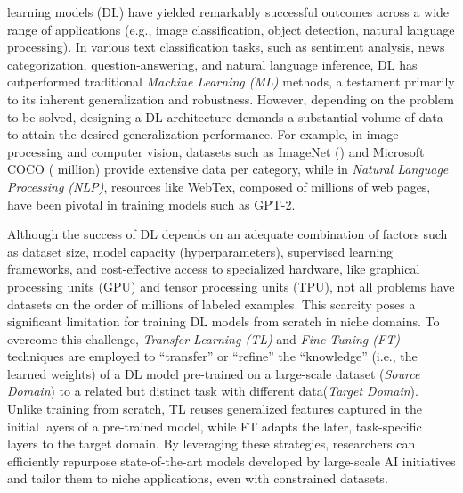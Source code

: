 \documentclass[onecolumn, journal, english, 12pt, a4paper]{IEEEtran} %
\theoremstyle{definition}
\begin{document}
 learning models (DL) have yielded remarkably
successful outcomes across a wide range of applications (e.g., image
classification, object detection, natural language
processing)\cite{PATHAK20181706}. In various text classification
tasks, such as sentiment analysis, news categorization,
question-answering, and natural language inference, DL has outperformed
traditional \emph{Machine Learning (ML)}  methods\cite{Minaee2021}, a
testament primarily to its inherent generalization and
robustness\parencite{Zahangir2018}. However, depending on the problem
to be solved, designing a DL architecture demands a substantial volume
of data to attain the desired generalization performance. For example,
in image processing and computer vision, datasets such as ImageNet
() and Microsoft COCO ( million)
provide extensive data per category\cite{PATHAK20181706}, while in
\emph{Natural Language Processing (NLP)}, resources like WebTex, composed of
millions of web pages, have been pivotal in training models such as
GPT-2\cite{radford2019language}.


Although the success of DL depends on an adequate combination of
factors such as dataset size, model capacity (hyperparameters),
supervised learning frameworks, and cost-effective access to
specialized hardware, like graphical processing units (GPU) and tensor
processing units (TPU)\cite{radford2019language,
  murphy2022probabilistic}, not all problems have datasets on the
order of millions of labeled examples. This scarcity poses a
significant limitation for training DL models from scratch in niche
domains. To overcome this challenge, \emph{Transfer Learning (TL)} and
\emph{Fine-Tuning (FT)} techniques are employed to \enquote{transfer}
or \enquote{refine} the \enquote{knowledge} (i.e., the learned
weights) of a DL model pre-trained on a large-scale dataset
(\textit{Source Domain}) to a related but distinct task with different
data(\textit{Target Domain}). Unlike training from scratch, TL reuses
generalized features captured in the initial layers of a pre-trained
model, while FT adapts the later, task-specific layers to the target
domain\cite{yosinski2014transferable}\cite{howard2018universallanguagemodelfinetuning}. By
leveraging these strategies, researchers can efficiently repurpose
state-of-the-art models developed by large-scale AI initiatives and
tailor them to niche applications, even with constrained datasets.
\end{document}
